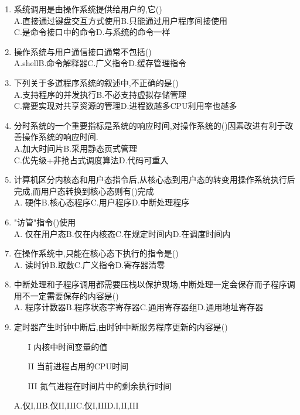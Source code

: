 \documentclass[12pt, a4paper, oneside, UTF8]{ctexbook}
\begin{document}
\begin{enumerate}
    \item 系统调用是由操作系统提供给用户的,它() \\
    A.直接通过键盘交互方式使用\qquad B.只能通过用户程序间接使用 \\
    C.是命令接口中的命令\qquad D.与系统的命令一样
    
    \item 操作系统与用户通信接口通常不包括() \\
    A.shell\qquad B.命令解释器\qquad C.广义指令\qquad D.缓存管理指令 

    \item 下列关于多道程序系统的叙述中,不正确的是() \\
    A.支持程序的并发执行\qquad B.不必支持虚拟存储管理 \\
    C.需要实现对共享资源的管理\qquad D.进程数越多CPU利用率也越多 

    \item 分时系统的一个重要指标是系统的响应时间,对操作系统的()因素改进有利于改善操作系统的响应时间. \\
    A.加大时间片\qquad B.采用静态页式管理 \\
    C.优先级+非抢占式调度算法\qquad D.代码可重入 

    \item 计算机区分内核态和用户态指令后,从核心态到用户态的转变用操作系统执行后完成,而用户态转换到核心态则有()完成 \\
    A. 硬件\qquad B.核心态程序\qquad C.用户程序\qquad D.中断处理程序

    \item "访管"指令()使用 \\
    A. 仅在用户态\qquad B.仅在内核态\qquad C.在规定时间内\qquad D.在调度时间内

    \item 在操作系统中,只能在核心态下执行的指令是() \\
    A. 读时钟\qquad B.取数\qquad C.广义指令\qquad D.寄存器清零

    \item 中断处理和子程序调用都需要压栈以保护现场,中断处理一定会保存而子程序调用不一定需要保存的内容是() \\
    A. 程序计数器\qquad B.程序状态字寄存器\qquad C.通用寄存器组\qquad D.通用地址寄存器

    \item 定时器产生时钟中断后,由时钟中断服务程序更新的内容是()
    \begin{enumerate}
        \item [I] 内核中时间变量的值
        \item [II] 当前进程占用的CPU时间
        \item [III] 氮气进程在时间片中的剩余执行时间
    \end{enumerate}
    A.仅I,II\qquad B.仅II,III\qquad C.仅I,III\qquad D.I,II,III


\end{enumerate}
\end{document}
